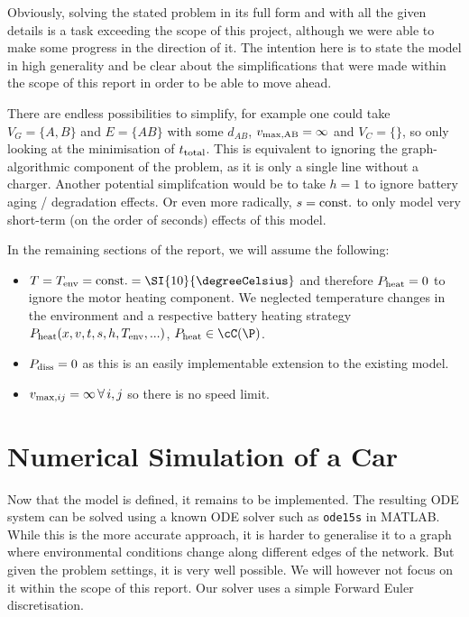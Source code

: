 \documentclass{prettytex/ox/mmsc-special-topic}
\begin{document}
  Obviously, solving the stated problem in its full form and with all the given details is a task exceeding the scope of this project, although we were able to make some progress in the direction of it.
  The intention here is to state the model in high generality and be clear about the simplifications that were made within the scope of this report in order to be able to move ahead.

  There are endless possibilities to simplify, for example one could take
  $V_G = \{A, B\}$ and $E = \{AB\}$ with some $d_{AB}$, $v_{\rm max, AB} = \infty$ and $V_C = \{\}$, so only looking at the minimisation of $t_{\rm total}$. This is equivalent to ignoring the graph-algorithmic component of the problem, as it is only a single line without a charger.
  Another potential simplifcation would be to take $h = 1$ to ignore battery aging / degradation effects. Or even more radically, $s = \rm const.$ to only model very short-term (on the order of seconds) effects of this model.

  In the remaining sections of the report, we will assume the following:
  \begin{itemize}
    \tightlist
    \item $T = T_{\rm env} = \rm const. = \SI{10}{\degreeCelsius}$ and therefore $P_{\rm heat} = 0$ to ignore the motor heating component. We neglected temperature changes in the environment and a respective battery heating strategy $P_{\rm heat}(x, v, t, s, h, T_{\rm env}, ...)$, $P_{\rm heat} \in \cC(\P)$.
    \item $P_{\rm diss} = 0$ as this is an easily implementable extension to the existing model.
    \item $v_{{\rm max}, ij} = \infty \,\forall\, i, j$ so there is no speed limit.
  \end{itemize}

  \section{Numerical Simulation of a Car}
  \label{sec:simulator}
  Now that the model is defined, it remains to be implemented.
  The resulting ODE system can be solved using a known ODE solver such as \texttt{ode15s} in MATLAB.
  While this is the more accurate approach, it is harder to generalise it to a graph where environmental conditions change along different edges of the network.
  But given the problem settings, it is very well possible.
  We will however not focus on it within the scope of this report.
  Our solver uses a simple Forward Euler discretisation.
\end{document}
